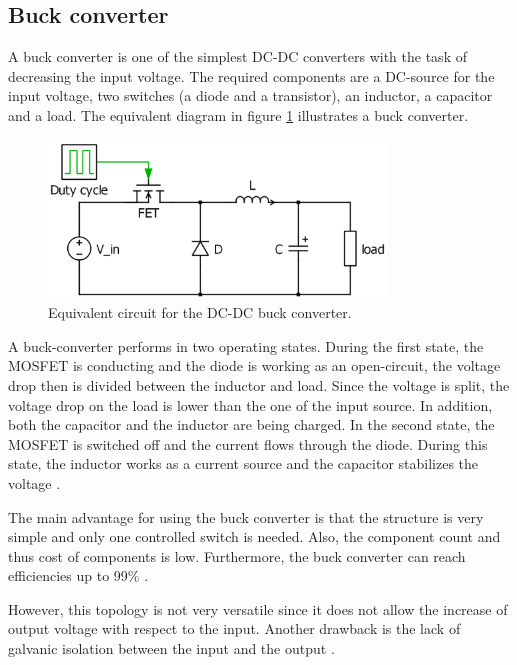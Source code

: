 \subsection{Buck converter\label{Buck-C}}

A buck converter is one of the simplest DC-DC converters with the task of decreasing the input voltage. The required components are a DC-source for the input voltage, two switches (a diode and a transistor), an inductor, a capacitor and a load. The equivalent diagram in figure \ref{Buck-converter} illustrates a buck converter. 

\begin{figure}[htbp]
	\begin{center}
		\includegraphics[width=0.8\textwidth]{../Pictures/Buck-converter}
		\caption{Equivalent circuit for the DC-DC buck converter.}
		\label{Buck-converter}
	\end{center}	
\end{figure}

A buck-converter performs in two operating states. 
During the first state, the MOSFET is conducting and the diode is working as an open-circuit, the voltage drop  then is divided between the inductor and load. Since the voltage is split, the voltage drop on the load is lower than the one of the input source. In addition, both the capacitor and the inductor are being charged. In the second state, the MOSFET is switched off and the current flows through the diode. During this state, the inductor works as a current source and the capacitor stabilizes the voltage \cite{schematicbuckandboost}.

The main advantage for using the buck converter is that the structure is very simple and only one controlled  switch is needed. Also, the component count and thus cost of components is low. Furthermore, the buck converter can reach efficiencies up to 99\% \cite{Efficiencybuck}. 

However, this topology is not very versatile since it does not allow the increase of output voltage with respect to the input. Another drawback is the lack of galvanic isolation between the input and the output \cite{advantagebuckboost}.

